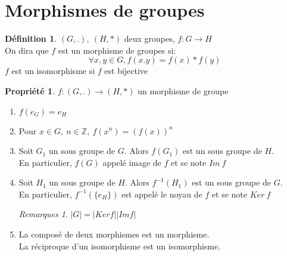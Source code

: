 \documentclass[fleqn]{article}
\theoremstyle{definition} \newtheorem*{defi}{D\'efinition}
\theoremstyle{definition} \newtheorem*{theo}{Th\'eor\`eme}
\theoremstyle{definition} \newtheorem*{coro}{Corollaire}
\theoremstyle{remark} \newtheorem*{rqs}{Remarques}
\theoremstyle{definition} \newtheorem*{prop}{Propri\'et\'e}
\begin{document}
\section{Morphismes de groupes}
\begin{defi}
$(G,.),\ (H, *)$ deux groupes, $f: G \rightarrow H$ \\
On dira que $f$ est un morphisme de groupes si:
\[\forall x,y \in G, f(x.y) = f(x) * f(y)\]
$f$ est un isomorphisme si $f$ est bijective
\end{defi}

\begin{prop} $f: (G,.) \rightarrow (H,*)$ un morphisme de groupe
	\begin{enumerate}
		\item $f(e_G) = e_H$
		\item Pour $x \in G,\ n \in \mathbb{Z},\ f(x^n) = (f(x))^n$
		\item Soit $G_1$ un sous groupe de $G$. Alors $f(G_1)$ est un sous groupe de $H$.\\ En particulier, $f(G)$ appel\'e image de $f$
			et se note $Im\ f$
		\item Soit $H_1$ un sous groupe de $H$. Alors $f^{-1}(H_1)$ est un sous groupe de $G$. \\ En particulier, $f^{-1}(\{e_H\})$ est
			appel\'e le noyau de $f$ et se note $Ker\ f$
		\begin{rqs} $|G| = |Ker f| |Im f|$ \end{rqs}
		\item La compos\'e de deux morphismes est un morphisme.\\
			La r\'eciproque d'un isomorphisme est un isomorphisme.
	\end{enumerate}
\end{prop}
\end{document}

